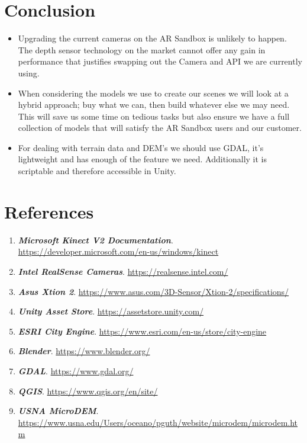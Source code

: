 \documentclass[letterpaper, 10pt, onecolumn, draftclsnofoot]{IEEEtran}
\begin{document}
\section{Conclusion}
\begin{itemize}
        \item {}
        Upgrading the current cameras on the AR Sandbox is unlikely to happen. The depth sensor technology on the market cannot offer any gain in performance that justifies swapping out the Camera and API we are currently using.
        \item {}
        When considering the models we use to create our scenes we will look at a hybrid approach; buy what we can, then build whatever else we may need. This will save us some time on tedious tasks but also ensure we have a full collection of models that will satisfy the AR Sandbox users and our customer.
        \item {}
        For dealing with terrain data and DEM’s we should use GDAL, it’s lightweight and has enough of  the feature we need. Additionally it is scriptable and therefore accessible in Unity.
\end{itemize}


\newpage
\section{References}
    \begin{enumerate}[label=\roman*]        
        \item{\textbf{\emph{Microsoft Kinect V2 Documentation}}. \url{https://developer.microsoft.com/en-us/windows/kinect}}
        \item{\textbf{\emph{Intel RealSense Cameras}}. \url{https://realsense.intel.com/}}
        \item{\textbf{\emph{Asus Xtion 2}}. \url{https://www.asus.com/3D-Sensor/Xtion-2/specifications/}}
        \item{\textbf{\emph{Unity Asset Store}}. \url{https://assetstore.unity.com/}}
        \item{\textbf{\emph{ESRI City Engine}}. \url{https://www.esri.com/en-us/store/city-engine}}
        \item{\textbf{\emph{Blender}}. \url{https://www.blender.org/}}
        \item{\textbf{\emph{GDAL}}. \url{https://www.gdal.org/}}
        \item{\textbf{\emph{QGIS}}. \url{https://www.qgis.org/en/site/}}
        \item{\textbf{\emph{USNA MicroDEM}}. \url{https://www.usna.edu/Users/oceano/pguth/website/microdem/microdem.htm}}
    \end{enumerate}
\end{document}
